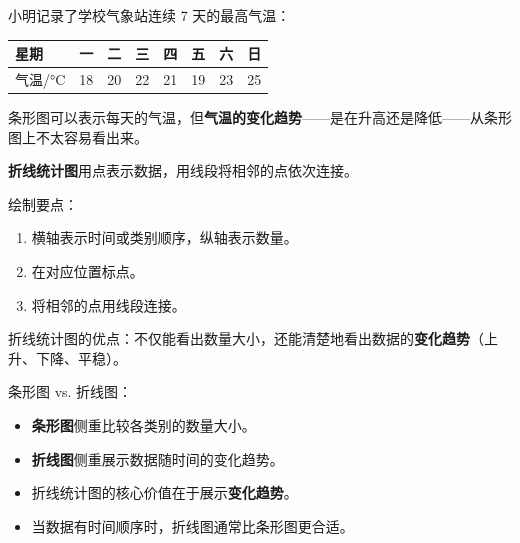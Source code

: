 \begin{explore}


小明记录了学校气象站连续 7 天的最高气温：

\begin{center}
\begin{tabular}{llllllll}
\toprule
星期 & 一 & 二 & 三 & 四 & 五 & 六 & 日 \\
\midrule
气温/°C & 18 & 20 & 22 & 21 & 19 & 23 & 25 \\
\bottomrule
\end{tabular}
\end{center}


条形图可以表示每天的气温，但\textbf{气温的变化趋势}——是在升高还是降低——从条形图上不太容易看出来。

\end{explore}

\begin{understand}


\textbf{折线统计图}用点表示数据，用线段将相邻的点依次连接。

绘制要点：
\begin{enumerate}
  \item 横轴表示时间或类别顺序，纵轴表示数量。
  \item 在对应位置标点。
  \item 将相邻的点用线段连接。
\end{enumerate}


折线统计图的优点：不仅能看出数量大小，还能清楚地看出数据的\textbf{变化趋势}（上升、下降、平稳）。

条形图 vs. 折线图：
\begin{itemize}
  \item \textbf{条形图}侧重比较各类别的数量大小。
  \item \textbf{折线图}侧重展示数据随时间的变化趋势。
\end{itemize}


\end{understand}

\begin{keytakeaway}


\begin{itemize}
  \item 折线统计图的核心价值在于展示\textbf{变化趋势}。
  \item 当数据有时间顺序时，折线图通常比条形图更合适。
\end{itemize}


\end{keytakeaway}



